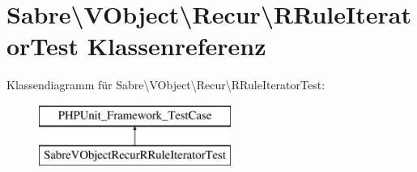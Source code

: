 \hypertarget{class_sabre_1_1_v_object_1_1_recur_1_1_r_rule_iterator_test}{}\section{Sabre\textbackslash{}V\+Object\textbackslash{}Recur\textbackslash{}R\+Rule\+Iterator\+Test Klassenreferenz}
\label{class_sabre_1_1_v_object_1_1_recur_1_1_r_rule_iterator_test}
Klassendiagramm für Sabre\textbackslash{}V\+Object\textbackslash{}Recur\textbackslash{}R\+Rule\+Iterator\+Test\+:\begin{figure}[H]
\begin{center}
\leavevmode
\includegraphics[height=2.000000cm]{class_sabre_1_1_v_object_1_1_recur_1_1_r_rule_iterator_test}
\end{center}
\end{figure}
